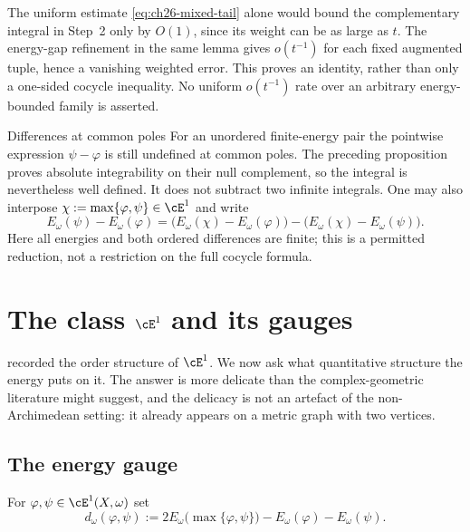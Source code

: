 \begin{remark}
\label{rem:ch26-cocycle-inequality}
The uniform estimate \eqref{eq:ch26-mixed-tail} alone would bound the
complementary integral in Step~2 only by $O(1)$, since its weight can be
as large as $t$.  The energy-gap refinement in the same lemma gives
$o(t^{-1})$ for each fixed augmented tuple, hence a vanishing weighted
error.  This proves an identity, rather than only a one-sided cocycle
inequality.  No uniform $o(t^{-1})$ rate over an arbitrary energy-bounded
family is asserted.
\end{remark}

\begin{warning}{Differences at common poles}
For an unordered finite-energy pair the pointwise expression
$\psi-\varphi$ is still undefined at common poles.  The preceding
proposition proves absolute integrability on their null complement, so the
integral is nevertheless well defined.  It does not subtract two infinite
integrals.  One may also interpose $\chi:=\max\{\varphi,\psi\}\in\cE^1$
and write
\[
 E_\omega(\psi)-E_\omega(\varphi)
 =\bigl(E_\omega(\chi)-E_\omega(\varphi)\bigr)
  -\bigl(E_\omega(\chi)-E_\omega(\psi)\bigr).
\]
Here all energies and both ordered differences are finite; this is a
permitted reduction, not a restriction on the full cocycle formula.
\end{warning}

\section{The class \texorpdfstring{$\cE^1$}{E1} and its gauges}
\label{sec:ch26-e1-gauge}

 recorded the order structure of $\cE^1$.  We
now ask what quantitative structure the energy puts on it.  The answer is
more delicate than the complex-geometric literature might suggest, and the
delicacy is not an artefact of the non-Archimedean setting: it already
appears on a metric graph with two vertices.

\subsection{The energy gauge}
\label{sec:ch26-gauge}

\begin{definition}
\label{def:ch26-gauge}
For $\varphi,\psi\in\cE^1(X,\omega)$ set
\begin{equation}
\label{eq:ch26-gauge}
 d_\omega(\varphi,\psi)
 :=2E_\omega\bigl(\max\{\varphi,\psi\}\bigr)
   -E_\omega(\varphi)-E_\omega(\psi).
\end{equation}
\end{definition}


